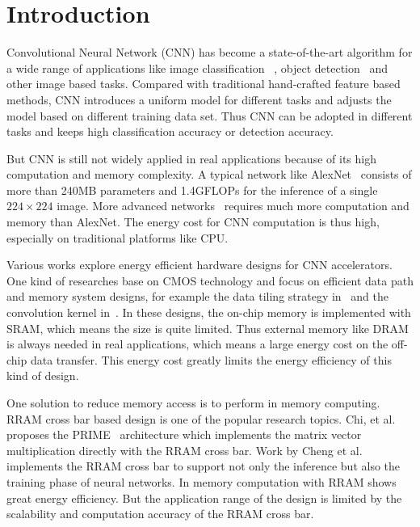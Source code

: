 \section{Introduction}

Convolutional Neural Network (CNN) has become a state-of-the-art algorithm for a wide range of applications like image classification~\cite{simonyan2014very}\cite{he2015deep} , object detection~\cite{redmon2015you} and other image based tasks. Compared with traditional hand-crafted feature based methods, CNN introduces a uniform model for different tasks and adjusts the model based on different training data set. Thus CNN can be adopted in different tasks and keeps high classification accuracy or detection accuracy.

But CNN is still not widely applied in real applications because of its high computation and memory complexity. A typical network like AlexNet~\cite{krizhevsky2012imagenet} consists of more than 240MB parameters and 1.4GFLOPs for the inference of a single $224\times 224$ image. More advanced networks~\cite{simonyan2014very}\cite{he2015deep} requires much more computation and memory than AlexNet. The energy cost for CNN computation is thus high, especially on traditional platforms like CPU.

Various works explore energy efficient hardware designs for CNN accelerators. One kind of researches base on CMOS technology and focus on efficient data path and memory system designs, for example the data tiling strategy in~\cite{zhang2015optimizing} and the convolution kernel in~\cite{qiu2016going}\cite{du2015shidiannao}. In these designs, the on-chip memory is implemented with SRAM, which means the size is quite limited. Thus external memory like DRAM is always needed in real applications, which means a large energy cost on the off-chip data transfer. This energy cost greatly limits the energy efficiency of this kind of design.

One solution to reduce memory access is to perform in memory computing. RRAM cross bar based design is one of the popular research topics. Chi, et al. proposes the PRIME~\cite{chi2016prime} architecture which implements the matrix vector multiplication directly with the RRAM cross bar. Work by Cheng et al.~\cite{cheng2017time} implements the RRAM cross bar to support not only the inference but also the training phase of neural networks. In memory computation with RRAM shows great energy efficiency. But the application range of the design is limited by the scalability and computation accuracy of the RRAM cross bar.


